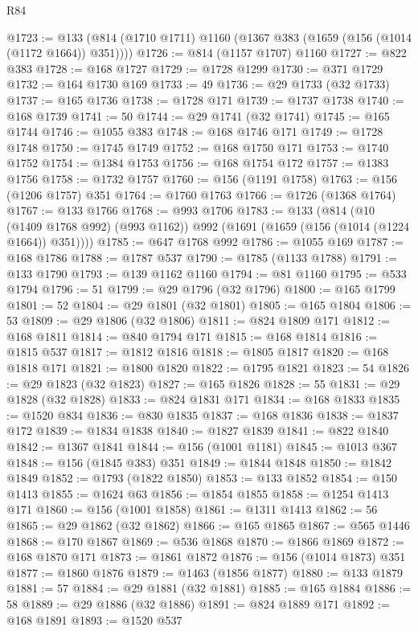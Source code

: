 \begin{lexlean}{R84}
\begin{coremodule}
@1723 := @133 (@814 (@1710 @1711) @1160 (@1367 @383 (@1659 (@156 (@1014 (@1172 @1664)) @351))))
@1726 := @814 (@1157 @1707) @1160
@1727 := @822 @383
@1728 := @168 @1727
@1729 := @1728 @1299
@1730 := @371 @1729
@1732 := @164 @1730 @169
@1733 := 49
@1736 := @29 @1733 (@32 @1733)
@1737 := @165 @1736
@1738 := @1728 @171
@1739 := @1737 @1738
@1740 := @168 @1739
@1741 := 50
@1744 := @29 @1741 (@32 @1741)
@1745 := @165 @1744
@1746 := @1055 @383
@1748 := @168 @1746 @171
@1749 := @1728 @1748
@1750 := @1745 @1749
@1752 := @168 @1750 @171
@1753 := @1740 @1752
@1754 := @1384 @1753
@1756 := @168 @1754 @172
@1757 := @1383 @1756
@1758 := @1732 @1757
@1760 := @156 (@1191 @1758)
@1763 := @156 (@1206 @1757) @351
@1764 := @1760 @1763
@1766 := @1726 (@1368 @1764)
@1767 := @133 @1766
@1768 := @993 @1706
@1783 := @133
    (@814
      (@10 (@1409 @1768 @992) (@993 @1162))
      @992
      (@1691 (@1659 (@156 (@1014 (@1224 @1664)) @351))))
@1785 := @647 @1768 @992
@1786 := @1055 @169
@1787 := @168 @1786
@1788 := @1787 @537
@1790 := @1785 (@1133 @1788)
@1791 := @133 @1790
@1793 := @139 @1162 @1160
@1794 := @81 @1160
@1795 := @533 @1794
@1796 := 51
@1799 := @29 @1796 (@32 @1796)
@1800 := @165 @1799
@1801 := 52
@1804 := @29 @1801 (@32 @1801)
@1805 := @165 @1804
@1806 := 53
@1809 := @29 @1806 (@32 @1806)
@1811 := @824 @1809 @171
@1812 := @168 @1811
@1814 := @840 @1794 @171
@1815 := @168 @1814
@1816 := @1815 @537
@1817 := @1812 @1816
@1818 := @1805 @1817
@1820 := @168 @1818 @171
@1821 := @1800 @1820
@1822 := @1795 @1821
@1823 := 54
@1826 := @29 @1823 (@32 @1823)
@1827 := @165 @1826
@1828 := 55
@1831 := @29 @1828 (@32 @1828)
@1833 := @824 @1831 @171
@1834 := @168 @1833
@1835 := @1520 @834
@1836 := @830 @1835
@1837 := @168 @1836
@1838 := @1837 @172
@1839 := @1834 @1838
@1840 := @1827 @1839
@1841 := @822 @1840
@1842 := @1367 @1841
@1844 := @156 (@1001 @1181)
@1845 := @1013 @367
@1848 := @156 (@1845 @383) @351
@1849 := @1844 @1848
@1850 := @1842 @1849
@1852 := @1793 (@1822 @1850)
@1853 := @133 @1852
@1854 := @150 @1413
@1855 := @1624 @63
@1856 := @1854 @1855
@1858 := @1254 @1413 @171
@1860 := @156 (@1001 @1858)
@1861 := @1311 @1413
@1862 := 56
@1865 := @29 @1862 (@32 @1862)
@1866 := @165 @1865
@1867 := @565 @1446
@1868 := @170 @1867
@1869 := @536 @1868
@1870 := @1866 @1869
@1872 := @168 @1870 @171
@1873 := @1861 @1872
@1876 := @156 (@1014 @1873) @351
@1877 := @1860 @1876
@1879 := @1463 (@1856 @1877)
@1880 := @133 @1879
@1881 := 57
@1884 := @29 @1881 (@32 @1881)
@1885 := @165 @1884
@1886 := 58
@1889 := @29 @1886 (@32 @1886)
@1891 := @824 @1889 @171
@1892 := @168 @1891
@1893 := @1520 @537

\end{coremodule}
\end{lexlean}
